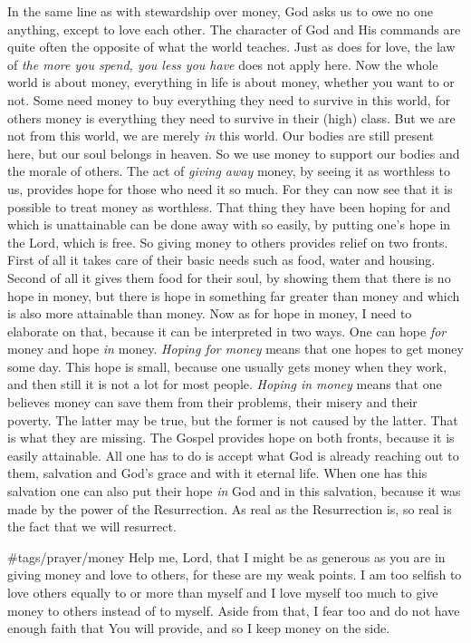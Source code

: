In the same line as with stewardship over money, God asks us to owe no
one anything, except to love each other. The character of God and His
commands are quite often the opposite of what the world teaches. Just as
does for love, the law of \emph{the more you spend, you less you have}
does not apply here. Now the whole world is about money, everything in
life is about money, whether you want to or not. Some need money to buy
everything they need to survive in this world, for others money is
everything they need to survive in their (high) class. But we are not
from this world, we are merely \emph{in} this world. Our bodies are
still present here, but our soul belongs in heaven. So we use money to
support our bodies and the morale of others. The act of \emph{giving
away} money, by seeing it as worthless to us, provides hope for those
who need it so much. For they can now see that it is possible to treat
money as worthless. That thing they have been hoping for and which is
unattainable can be done away with so easily, by putting one's hope in
the Lord, which is free. So giving money to others provides relief on
two fronts. First of all it takes care of their basic needs such as
food, water and housing. Second of all it gives them food for their
soul, by showing them that there is no hope in money, but there is hope
in something far greater than money and which is also more attainable
than money. Now as for hope in money, I need to elaborate on that,
because it can be interpreted in two ways. One can hope \emph{for} money
and hope \emph{in} money. \emph{Hoping for money} means that one hopes
to get money some day. This hope is small, because one usually gets
money when they work, and then still it is not a lot for most people.
\emph{Hoping in money} means that one believes money can save them from
their problems, their misery and their poverty. The latter may be true,
but the former is not caused by the latter. That is what they are
missing. The Gospel provides hope on both fronts, because it is easily
attainable. All one has to do is accept what God is already reaching out
to them, salvation and God's grace and with it eternal life. When one
has this salvation one can also put their hope \emph{in} God and in this
salvation, because it was made by the power of the Resurrection. As real
as the Resurrection is, so real is the fact that we will resurrect.

\#tags/prayer/money Help me, Lord, that I might be as generous as you
are in giving money and love to others, for these are my weak points. I
am too selfish to love others equally to or more than myself and I love
myself too much to give money to others instead of to myself. Aside from
that, I fear too and do not have enough faith that You will provide, and
so I keep money on the side.

